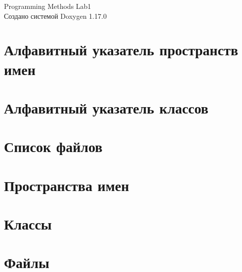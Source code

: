 \documentclass[twoside]{book}
\newcommand{\+}{\discretionary{\mbox{\scriptsize$\hookleftarrow$}}{}{}}
\newcommand{\clearemptydoublepage}{%
    \newpage{\pagestyle{empty}\cleardoublepage}%
  }
\begin{document}
  \raggedbottom
    \hypersetup{pageanchor=false,
                bookmarksnumbered=true,
                pdfencoding=unicode
               }
  \begin{titlepage}
  \vspace*{7cm}
  \begin{center}%
  {\Large Programming Methods Lab1}\\
  \vspace*{1cm}
  {\large Создано системой Doxygen 1.17.0}\\
  \end{center}
  \end{titlepage}
  \clearemptydoublepage
  \tableofcontents
  \clearemptydoublepage
  \hypersetup{pageanchor=true}
\chapter{Алфавитный указатель пространств имен}

\chapter{Алфавитный указатель классов}

\chapter{Список файлов}

\chapter{Пространства имен}

\chapter{Классы}

\chapter{Файлы}











  \backmatter
  \newpage
  \clearemptydoublepage
  \printindex
\end{document}
